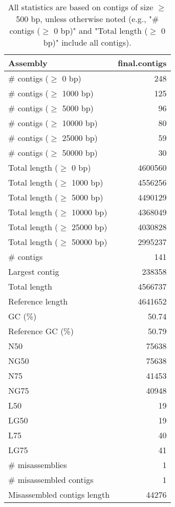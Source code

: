 \documentclass[12pt,a4paper]{article}
\begin{document}
\begin{table}[ht]
\begin{center}
\caption{All statistics are based on contigs of size $\geq$ 500 bp, unless otherwise noted (e.g., "\# contigs ($\geq$ 0 bp)" and "Total length ($\geq$ 0 bp)" include all contigs).}
\begin{tabular}{|l*{1}{|r}|}
\hline
Assembly & final.contigs \\ \hline
\# contigs ($\geq$ 0 bp) & 248 \\ \hline
\# contigs ($\geq$ 1000 bp) & 125 \\ \hline
\# contigs ($\geq$ 5000 bp) & 96 \\ \hline
\# contigs ($\geq$ 10000 bp) & 80 \\ \hline
\# contigs ($\geq$ 25000 bp) & 59 \\ \hline
\# contigs ($\geq$ 50000 bp) & 30 \\ \hline
Total length ($\geq$ 0 bp) & 4600560 \\ \hline
Total length ($\geq$ 1000 bp) & 4556256 \\ \hline
Total length ($\geq$ 5000 bp) & 4490129 \\ \hline
Total length ($\geq$ 10000 bp) & 4368049 \\ \hline
Total length ($\geq$ 25000 bp) & 4030828 \\ \hline
Total length ($\geq$ 50000 bp) & 2995237 \\ \hline
\# contigs & 141 \\ \hline
Largest contig & 238358 \\ \hline
Total length & 4566737 \\ \hline
Reference length & 4641652 \\ \hline
GC (\%) & 50.74 \\ \hline
Reference GC (\%) & 50.79 \\ \hline
N50 & 75638 \\ \hline
NG50 & 75638 \\ \hline
N75 & 41453 \\ \hline
NG75 & 40948 \\ \hline
L50 & 19 \\ \hline
LG50 & 19 \\ \hline
L75 & 40 \\ \hline
LG75 & 41 \\ \hline
\# misassemblies & 1 \\ \hline
\# misassembled contigs & 1 \\ \hline
Misassembled contigs length & 44276 \\ \hline

\end{tabular}
\end{center}
\end{table}
\end{document}
